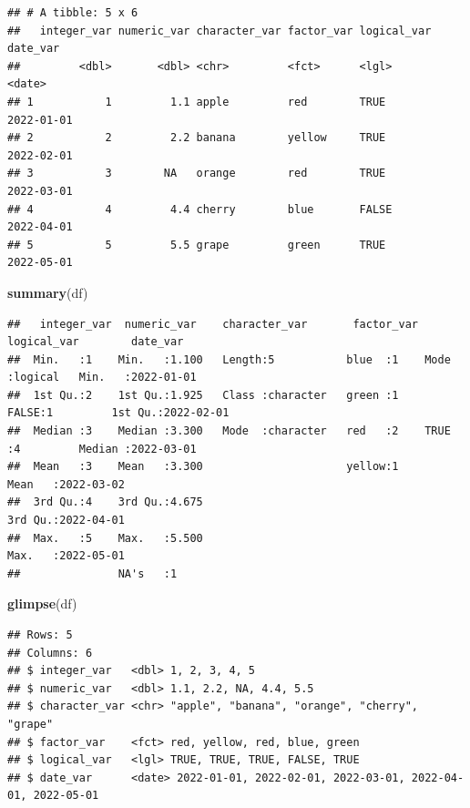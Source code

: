 \documentclass[
  12pt,
  oneside]{book}
\newenvironment{Shaded}{\begin{snugshade}}{\end{snugshade}}
\newcommand{\FunctionTok}[1]{\textcolor[rgb]{0.13,0.29,0.53}{\textbf{#1}}}
\newcommand{\NormalTok}[1]{#1}
\begin{document}
\begin{verbatim}
## # A tibble: 5 x 6
##   integer_var numeric_var character_var factor_var logical_var date_var  
##         <dbl>       <dbl> <chr>         <fct>      <lgl>       <date>    
## 1           1         1.1 apple         red        TRUE        2022-01-01
## 2           2         2.2 banana        yellow     TRUE        2022-02-01
## 3           3        NA   orange        red        TRUE        2022-03-01
## 4           4         4.4 cherry        blue       FALSE       2022-04-01
## 5           5         5.5 grape         green      TRUE        2022-05-01
\end{verbatim}

\begin{Shaded}
\begin{Highlighting}[]
\FunctionTok{summary}\NormalTok{(df)}
\end{Highlighting}
\end{Shaded}

\begin{verbatim}
##   integer_var  numeric_var    character_var       factor_var logical_var        date_var         
##  Min.   :1    Min.   :1.100   Length:5           blue  :1    Mode :logical   Min.   :2022-01-01  
##  1st Qu.:2    1st Qu.:1.925   Class :character   green :1    FALSE:1         1st Qu.:2022-02-01  
##  Median :3    Median :3.300   Mode  :character   red   :2    TRUE :4         Median :2022-03-01  
##  Mean   :3    Mean   :3.300                      yellow:1                    Mean   :2022-03-02  
##  3rd Qu.:4    3rd Qu.:4.675                                                  3rd Qu.:2022-04-01  
##  Max.   :5    Max.   :5.500                                                  Max.   :2022-05-01  
##               NA's   :1
\end{verbatim}

\begin{Shaded}
\begin{Highlighting}[]
\FunctionTok{glimpse}\NormalTok{(df)}
\end{Highlighting}
\end{Shaded}

\begin{verbatim}
## Rows: 5
## Columns: 6
## $ integer_var   <dbl> 1, 2, 3, 4, 5
## $ numeric_var   <dbl> 1.1, 2.2, NA, 4.4, 5.5
## $ character_var <chr> "apple", "banana", "orange", "cherry", "grape"
## $ factor_var    <fct> red, yellow, red, blue, green
## $ logical_var   <lgl> TRUE, TRUE, TRUE, FALSE, TRUE
## $ date_var      <date> 2022-01-01, 2022-02-01, 2022-03-01, 2022-04-01, 2022-05-01
\end{verbatim}
\end{document}
